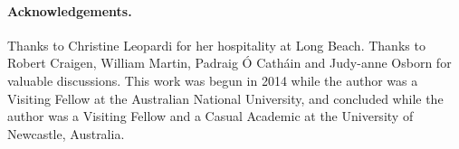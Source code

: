 \documentclass[12pt,a4paper]{article}
\begin{document}
\paragraph*{Acknowledgements.}

Thanks to Christine Leopardi for her hospitality at Long Beach.
Thanks to Robert Craigen, William Martin,
Padraig {\'O} Cath{\'a}in and Judy-anne Osborn for valuable discussions.
This work was begun in 2014 while the author was a Visiting Fellow at the Australian National University, 
and concluded while the author was a Visiting Fellow and a Casual Academic at the University of Newcastle, Australia.





\end{document}
